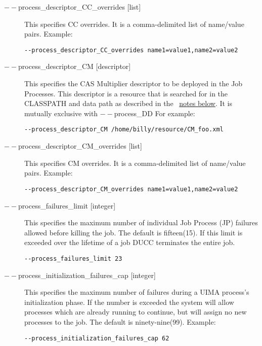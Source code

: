 \begin{description}
           \item[$--$process\_descriptor\_CC\_overrides {[list]}  ]

             This specifies CC overrides. It is a comma-delimited list of name/value pairs. Example: 
             \begin{verbatim}
--process_descriptor_CC_overrides name1=value1,name2=value2 
             \end{verbatim}
             
           \item[$--$process\_descriptor\_CM {[descriptor]} ]

             This specifies the CAS Multiplier descriptor to be deployed in the Job Processes. This 
             descriptor is a resource that is searched for in the CLASSPATH and data path as described 
             in the ~\hyperref[par:cli.submit.notes]{notes below}.
             It is mutually exclusive with $--$process\_DD For example: 
             \begin{verbatim}             
--process_descriptor_CM /home/billy/resource/CM_foo.xml 
             \end{verbatim}

           \item[$--$process\_descriptor\_CM\_overrides {[list]}  ]

             This specifies CM overrides. It is a comma-delimited list of name/value pairs. Example: 
             \begin{verbatim}
--process_descriptor_CM_overrides name1=value1,name2=value2 
\end{verbatim}
             
           \item[$--$process\_failures\_limit {[integer]} ]

             This specifies the maximum number of individual Job Process (JP) failures allowed
             before killing the job. The default is fifteen(15). If this limit is exceeded over the lifetime 
             of a job DUCC terminates the entire job. 
             \begin{verbatim}
--process_failures_limit 23
\end{verbatim}
                          
           \item[$--$process\_initialization\_failures\_cap {[integer]} ] This specifies the maximum
             number of failures during a UIMA process's initialization phase.  If the number is
             exceeded the system will allow processes which are already running to continue, but
             will assign no new processes to the job.  The default is ninety-nine(99). Example:
             \begin{verbatim}
--process_initialization_failures_cap 62 
             \end{verbatim}
             

\end{description}
